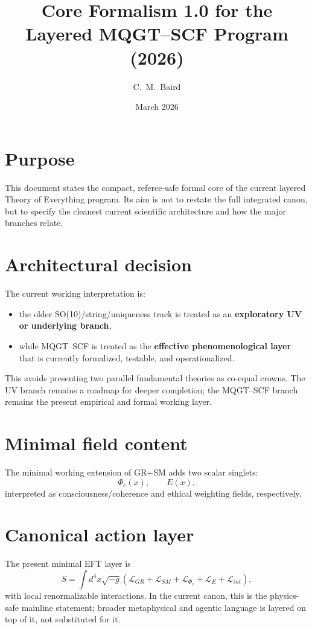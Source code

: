 \documentclass[reprint,amsmath,amssymb,aps,showkeys]{revtex4-2}
\title{Core Formalism 1.0 for the Layered MQGT--SCF Program (2026)}
\author{C.~M.~Baird}
\affiliation{Baird--ZoraASI Collaboration}
\date{March 2026}
\begin{document}
\maketitle

\section*{Purpose}
This document states the compact, referee-safe formal core of the current layered Theory of Everything program. Its aim is not to restate the full integrated canon, but to specify the cleanest current scientific architecture and how the major branches relate.

\section*{Architectural decision}
The current working interpretation is:
\begin{itemize}
    \item the older SO(10)/string/uniqueness track is treated as an \textbf{exploratory UV or underlying branch},
    \item while MQGT--SCF is treated as the \textbf{effective phenomenological layer} that is currently formalized, testable, and operationalized.
\end{itemize}
This avoids presenting two parallel fundamental theories as co-equal crowns. The UV branch remains a roadmap for deeper completion; the MQGT--SCF branch remains the present empirical and formal working layer.

\section*{Minimal field content}
The minimal working extension of GR+SM adds two scalar singlets:
\[
\Phi_c(x), \qquad E(x),
\]
interpreted as consciousness/coherence and ethical weighting fields, respectively.

\section*{Canonical action layer}
The present minimal EFT layer is
\[
S=\int d^4x\sqrt{-g}\left(\mathcal{L}_{GR}+\mathcal{L}_{SM}+\mathcal{L}_{\Phi_c}+\mathcal{L}_{E}+\mathcal{L}_{int}\right),
\]
with local renormalizable interactions. In the current canon, this is the physics-safe mainline statement; broader metaphysical and agentic language is layered on top of it, not substituted for it.
\end{document}
